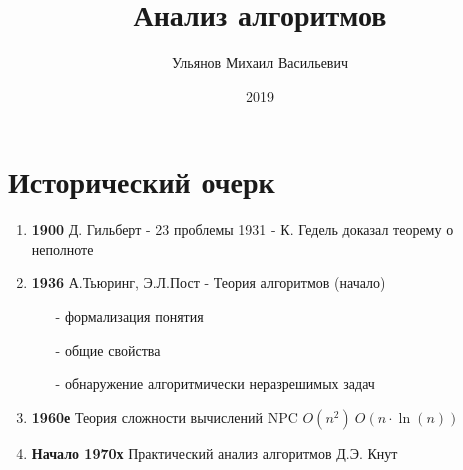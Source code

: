 \documentclass[a4paper, 14pt]{report}
\author{Ульянов Михаил Васильевич}
\title{Анализ алгоритмов}
\date{2019}
\begin{document}
    \maketitle

    \tableofcontents
    \clearpage

    \chapter{Исторический очерк}

    \begin{enumerate}
        \item \textbf{1900} \newline
            Д. Гильберт - 23 проблемы
            1931 - К. Гедель доказал теорему о неполноте
        \item \textbf{1936} \newline
            А.Тьюринг, Э.Л.Пост - Теория алгоритмов (начало)
        \begin{enumerate}
            \item[-] формализация понятия
            \item[-] общие свойства
            \item[-] обнаружение алгоритмически неразрешимых задач
        \end{enumerate}
        \item \textbf{1960е} \newline
            Теория сложности вычислений NPC \newline
            $O(n^2)\ O(n \cdot \ln(n))$


        \item \textbf{Начало 1970х} \newline
            Практический анализ алгоритмов Д.Э. Кнут
    \end{enumerate}
\end{document}
